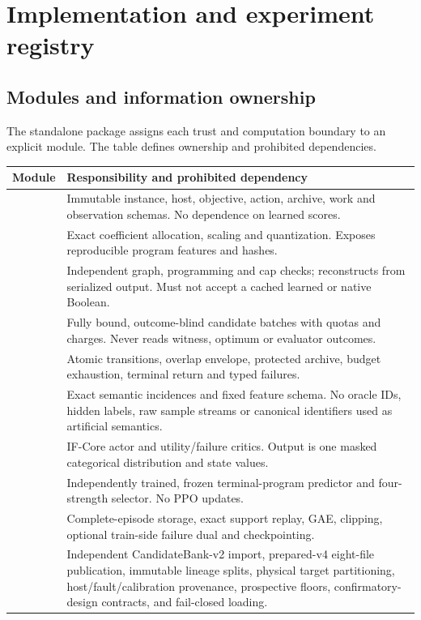 \section{Implementation and experiment registry}\label{sec:implementation}
\subsection{Modules and information ownership}
The standalone package assigns each trust and computation boundary to an explicit module. The table defines ownership and prohibited dependencies.

{\small\begin{longtable}{@{}P{.30\textwidth}P{.63\textwidth}@{}}
\toprule
Module & Responsibility and prohibited dependency\\\midrule\endhead
{} & Immutable instance, host, objective, action, archive, work and observation schemas. No dependence on learned scores.\\
 & Exact coefficient allocation, scaling and quantization. Exposes reproducible program features and hashes.\\
 & Independent graph, programming and cap checks; reconstructs from serialized output. Must not accept a cached learned or native Boolean.\\
 & Fully bound, outcome-blind candidate batches with quotas and charges. Never reads witness, optimum or evaluator outcomes.\\
 & Atomic transitions, overlap envelope, protected archive, budget exhaustion, terminal return and typed failures.\\
 & Exact semantic incidences and fixed feature schema. No oracle IDs, hidden labels, raw sample streams or canonical identifiers used as artificial semantics.\\
 & IF-Core actor and utility/failure critics. Output is one masked categorical distribution and state values.\\
 & Independently trained, frozen terminal-program predictor and four-strength selector. No PPO updates.\\
 & Complete-episode storage, exact support replay, GAE, clipping, optional train-side failure dual and checkpointing.\\
\newline{} & Independent CandidateBank-v2 import, prepared-v4 eight-file publication, immutable lineage splits, physical target partitioning, host/fault/calibration provenance, prospective floors, confirmatory-design contracts, and fail-closed loading.\\

\end{longtable}}
